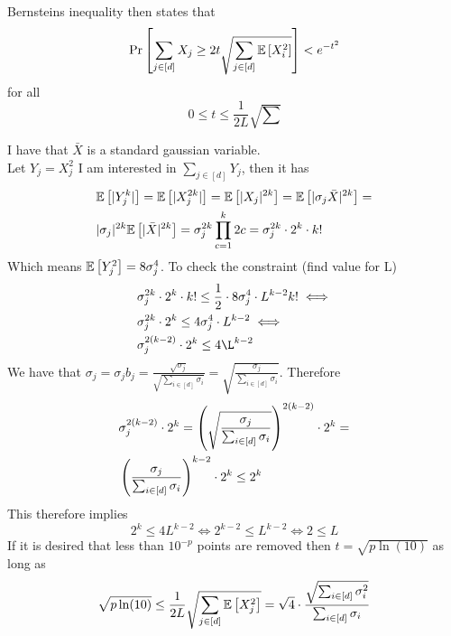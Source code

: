 \documentclass[a4paper,12pt]{article}
\begin{document}
\newpage





Bernsteins inequality then states that
\[
    \Pr\left [\sum_{j \in [d]} X_j \ge 2 t \sqrt{ \sum_{j \in [d]} \mathbb{E} \left [ X_i^2  \right]} \right] < e^{-t^2}
\]
for all 
\[
    0 \le t \le \frac{1}{2L} \sqrt{\sum}
\]

I have that $\bar{X}$ is a standard gaussian variable. \\
Let $Y_j = X_j^2$ I am interested in $\sum_{j \in [d]} Y_j$,
then it has 
\begin{align*}
    &\mathbb{E} \left [  |Y_j^k|   \right] = \mathbb{E} \left [  |X_j^{2k}|   \right] = \mathbb{E} \left [  |X_j|^{2k}   \right] = 
    \mathbb{E} \left [  | \sigma_j \bar{X} |^{2k}   \right] = \\
    &| \sigma_j |^{2k} \mathbb{E} \left [  | \bar{X} |^{2k}  \right] = 
    \sigma_j ^{2k} \prod_{c=1}^k 2c = \sigma_j^{2k} \cdot 2^k \cdot k!
\end{align*}
Which means $\mathbb{E} \left [ Y_j^2  \right] = 8 \sigma_j^{4}$.
To check the constraint (find value for L)
\begin{align*}
    &\sigma_j^{2k} \cdot 2^k \cdot k! \le
    \frac{1}{2} \cdot 8 \sigma_j^{4} \cdot L^{k-2} k! \iff \\
    &\sigma_j^{2k} \cdot 2^k \le 4 \sigma_j^4 \cdot L^{k-2} \iff \\
    &\sigma_j^{2(k-2)} \cdot 2^k \le 4 \L^{k-2}
\end{align*}
We have that 
$\sigma_j = \sigma_j b_j = \frac{\sqrt{\sigma_j}}{\sqrt{\sum_{i \in [d]} \sigma_i}} = \sqrt{\frac{\sigma_j}{\sum_{i \in [d]} \sigma_i}}$.
Therefore
\begin{align*}
    &\sigma_j^{2(k-2)} \cdot 2^k  = 
    \left (\sqrt{\frac{\sigma_j}{\sum_{i \in [d]}\sigma_i}}\right)^{2(k-2)} \cdot 2^k = \\
    &\left (\frac{\sigma_j}{\sum_{i \in [d]}\sigma_i}\right)^{k-2} \cdot 2^k \le 2^k
\end{align*}
This therefore implies
\[
    2^k \le 4 L^{k-2} \iff
    2^{k-2} \le L^{k-2} \iff
    2 \le L
\]
If it is desired that less than $10^{-p}$ points are removed then 
$t = \sqrt{p \ln(10) }$ as long as 
\[
    \sqrt{p \ln(10)} \le \frac{1}{2L}\sqrt{\sum_{j \in [d]} \mathbb{E} \left [ X_j^2  \right]} 
    = \sqrt{4} \cdot \frac{\sqrt{\sum_{i \in [d]} \sigma_i^2}}{\sum_{i \in [d]} \sigma_i}
\] 
\end{document}
